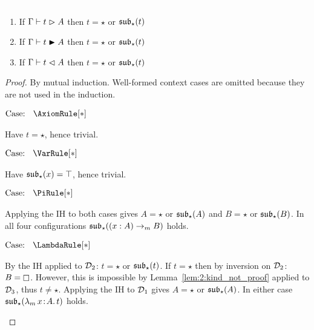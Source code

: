 \begin{lemma}
    \textcolor{white}{\_}
    \begin{enumerate}
        \item If $\Gamma \vdash t \vartriangleright A$ then $t = \star$ or $\mathfrak{sub}_\star(t)$
        \item If $\Gamma \vdash t \blacktriangleright A$ then $t = \star$ or $\mathfrak{sub}_\star(t)$
        \item If $\Gamma \vdash t \vartriangleleft A$ then $t = \star$ or $\mathfrak{sub}_\star(t)$
    \end{enumerate}
    \label{lem:2:star_proof_valid}
\end{lemma}
\begin{proof}
    By mutual induction.
    Well-formed context cases are omitted because they are not used in the induction.

    $\text{Case: }\begin{array}{c} \AxiomRule[*] \end{array}$
    \begin{proofcase}
        Have $t = \star$, hence trivial.
    \end{proofcase}

    $\text{Case: }\begin{array}{c} \VarRule[*] \end{array}$
    \begin{proofcase}
        Have $\mathfrak{sub}_\star(x) = \top$, hence trivial.
    \end{proofcase}

    $\text{Case: }\begin{array}{c} \PiRule[*] \end{array}$
    \begin{proofcase}
        Applying the IH to both cases gives $A = \star$ or $\mathfrak{sub}_\star(A)$ and $B = \star$ or $\mathfrak{sub}_\star(B)$.
        In all four configurations $\mathfrak{sub}_\star((x : A) \to_m B)$ holds.
    \end{proofcase}

    $\text{Case: }\begin{array}{c} \LambdaRule[*] \end{array}$
    \begin{proofcase}
        By the IH applied to $\mathcal{D}_{2}$: $t = \star$ or $\mathfrak{sub}_\star(t)$.
        If $t = \star$ then by inversion on $\mathcal{D}_{2}$: $B = \kind$.
        However, this is impossible by Lemma~\ref{lem:2:kind_not_proof} applied to $\mathcal{D}_{3}$, thus $t \neq \star$.
        Applying the IH to $\mathcal{D}_{1}$ gives $A = \star$ or $\mathfrak{sub}_\star(A)$.
        In either case $\mathfrak{sub}_\star({\lambda_m}\, x\! : \! A.\, t)$ holds.
    \end{proofcase}


\end{proof}
